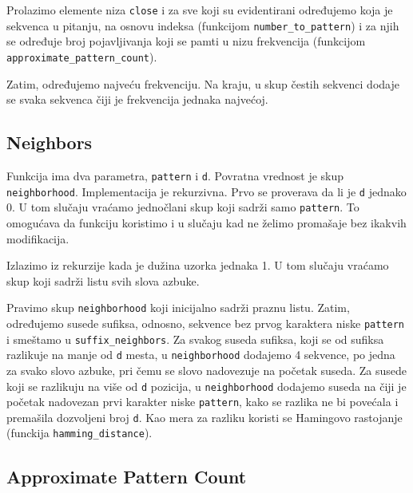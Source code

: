 Prolazimo elemente niza \texttt{close} i za sve koji su evidentirani određujemo koja je sekvenca u pitanju, na osnovu indeksa (funkcijom \texttt{number\_to\_pattern}) i za njih se određuje broj pojavljivanja koji se pamti u nizu frekvencija (funkcijom \texttt{approximate\_pattern\_count}). 

Zatim, određujemo najveću frekvenciju. Na kraju, u skup čestih sekvenci dodaje se svaka sekvenca čiji je frekvencija jednaka najvećoj.




\subsection{Neighbors}

Funkcija ima dva parametra, \texttt{pattern} i \texttt{d}. Povratna vrednost je skup \texttt{neighborhood}. Implementacija je rekurzivna. Prvo se proverava da li je \texttt{d} jednako 0. U tom slučaju vraćamo jednočlani skup koji sadrži samo \texttt{pattern}. To omogućava da funkciju koristimo i u slučaju kad ne želimo promašaje bez ikakvih modifikacija.

Izlazimo iz rekurzije kada je dužina uzorka jednaka 1. U tom slučaju vraćamo skup koji sadrži listu svih slova azbuke. 

Pravimo skup \texttt{neighborhood} koji inicijalno sadrži praznu listu. Zatim, određujemo susede sufiksa, odnosno, sekvence bez prvog karaktera niske \texttt{pattern} i smeštamo u \texttt{suffix\_neighbors}. Za svakog suseda sufiksa, koji se od sufiksa razlikuje na manje od \texttt{d} mesta, u \texttt{neighborhood} dodajemo 4 sekvence, po jedna za svako slovo azbuke, pri čemu se slovo nadovezuje na početak suseda. Za susede koji se razlikuju na više od \texttt{d} pozicija, u \texttt{neighborhood} dodajemo suseda na čiji je početak nadovezan prvi karakter niske \texttt{pattern}, kako se razlika ne bi povećala i premašila dozvoljeni broj \texttt{d}. Kao mera za razliku koristi se Hamingovo rastojanje (funckija \texttt{hamming\_distance}).






\subsection{Approximate Pattern Count}

